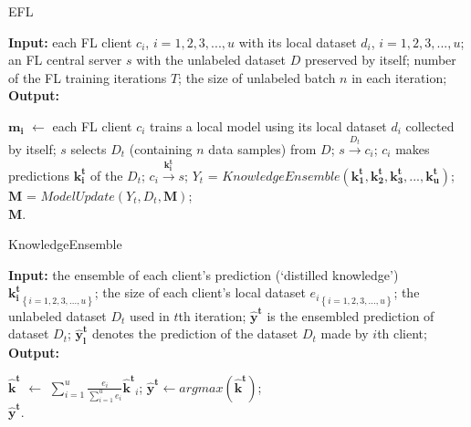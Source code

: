 \documentclass[lettersize,journal]{IEEEtran}
\begin{document}
\begin{algorithm}[t]
\caption{EFL} %
\label{alg:system}
\hspace*{0.02in} {\bf Input:} %
each FL client $c_i$, $i=1,2,3,...,u$ with its local dataset $d_i$, $i=1,2,3,...,u$; an FL central server $s$ with the unlabeled dataset $D$ preserved by itself; number of the FL training iterations $T$; the size of unlabeled batch $n$ in each iteration;\\
\hspace*{0.02in} {\bf Output:} %
\begin{algorithmic}[1]
  \State $\mathbf{m_i}$ $\gets$ each FL client $c_i$ trains a local model using its local dataset $d_i$ collected by itself;
    \State $s$ selects $D_t$ (containing $n$ data samples) from $D$;
      \State $s \overset{D_{t}}{\rightarrow} c_{i}$;
      \State $c_i$ makes predictions $\mathbf{k_i^t}$ of the $D_t$;
      \State $c_i \overset{\mathbf{k_i^t}}{\rightarrow} s$;
    \EndFor
    \State $Y_t$ = $KnowledgeEnsemble(\mathbf{k_1^t},\mathbf{k_2^t},\mathbf{k_3^t},...,\mathbf{k_u^t})$;
    \State $\mathbf{M}$ = $ModelUpdate(Y_t, D_t, \mathbf{M})$;
  \EndFor \\
  \Return $\mathbf{M}$.
\end{algorithmic}
\end{algorithm}

\begin{algorithm}[t]
\caption{KnowledgeEnsemble} %
\label{alg:KnowledgeEnsemble}
\hspace*{0.02in} {\bf Input:} %
the ensemble of each client's prediction (`distilled knowledge') ${\mathbf{k_i^t}}_{\left \{ i= 1,2,3,...,u \right \}}$; the size of each client's local dataset ${e_i}_{\left \{ i= 1,2,3,...,u \right \}}$; the unlabeled dataset $D_t$ used in $t$th iteration; $\mathbf{\hat{y}^t}$ is the ensembled prediction of dataset $D_t$; $\mathbf{\hat{y}^t_l}$ denotes the prediction of the dataset $D_t$ made by $i$th client;\\
\hspace*{0.02in} {\bf Output:} %
\begin{algorithmic}[1]
    \State $\mathbf{\hat{k}^t}$ $\gets$ $\sum_{i=1}^{u}\frac{e_i}{\sum_{i=1}^{u}e_i}\mathbf{\hat{k}^t}_i$;
    \State $\mathbf{\hat{y}^t}\gets argmax(\mathbf{\hat{k}^t})$;
  \EndFor \\
  \Return $\mathbf{\hat{y}^t}$.
\end{algorithmic}

\end{algorithm}
\end{document}
